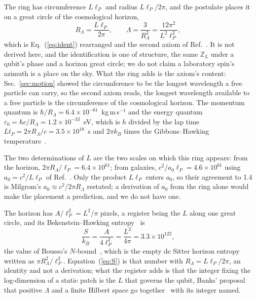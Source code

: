 \documentclass[aps,prd,twocolumn,superscriptaddress,nofootinbib]{revtex4-2}
\begin{document}
The ring has circumference $L\ell_P$ and radius $L\ell_P/2\pi$, and the postulate places it on a great circle of the cosmological horizon,
\begin{equation}
R_\Lambda = \frac{L\ell_P}{2\pi}, \qquad \Lambda = \frac{3}{R_\Lambda^2} = \frac{12\pi^2}{L^2\ell_P^2},
\label{eq:closure}
\end{equation}
which is Eq.~(\ref{eq:ident}) rearranged and the second axiom of Ref.~\cite{korytko2026}. It is not derived here, and the identification is one of structure, the same $\mathbb{Z}_L$ under a qubit's phase and a horizon great circle; we do not claim a laboratory spin's azimuth is a place on the sky. What the ring adds is the axiom's content: Sec.~\ref{sec:motion} showed the circumference to be the longest wavelength a free particle can carry, so the second axiom reads, the longest wavelength available to a free particle is the circumference of the cosmological horizon. The momentum quantum is $\hbar/R_\Lambda = 6.4\times10^{-61}$~kg\,m\,s$^{-1}$ and the energy quantum $\varepsilon_0 = \hbar c/R_\Lambda = 1.2\times10^{-33}$~eV, which is $h$ divided by the lap time $Lt_P = 2\pi R_\Lambda/c = 3.5\times10^{18}$~s and $2\pi k_B$ times the Gibbons--Hawking temperature~\cite{gibbons1977}.

The two determinations of $L$ are the two scales on which this ring appears: from the horizon, $2\pi R_\Lambda/\ell_P = 6.4\times10^{61}$; from galaxies, $c^2/a_0\ell_P = 4.6\times10^{61}$ using $a_0 = c^2/L\ell_P$ of Ref.~\cite{korytko2026}. Only the product $L\ell_P$ enters $a_0$, so their agreement to 1.4 is Milgrom's $a_0 \approx c^2/2\pi R_\Lambda$ restated; a derivation of $a_0$ from the ring alone would make the placement a prediction, and we do not have one.

The horizon has $A/\ell_P^2 = L^2/\pi$ pixels, a register being the $L$ along one great circle, and its Bekenstein--Hawking entropy~\cite{bekenstein1973} is
\begin{equation}
\frac{S}{k_B} = \frac{A}{4\ell_P^2} = \frac{L^2}{4\pi} = 3.3\times10^{122},
\label{eq:S}
\end{equation}
the value of Bousso's $N$-bound~\cite{bousso2000,bousso1999b}, which is the empty de Sitter horizon entropy written as $\pi R_\Lambda^2/\ell_P^2$. Equation~(\ref{eq:S}) is that number with $R_\Lambda = L\ell_P/2\pi$, an identity and not a derivation; what the register adds is that the integer fixing the log-dimension of a static patch is the $L$ that governs the qubit, Banks' proposal that positive $\Lambda$ and a finite Hilbert space go together~\cite{banks2000} with its integer named.
\end{document}
